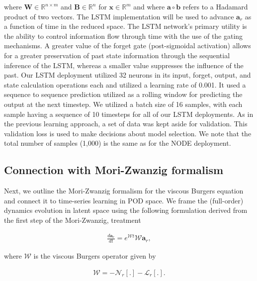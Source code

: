 \documentclass[preprint,12pt]{elsarticle}
\begin{document}
where $\boldsymbol{W} \in \mathbb{R}^{n \times m}$ and $\boldsymbol{B} \in \mathbb{R}^{n}$ for $\mathbf{x} \in \mathbb{R}^m$ and where $\mathbf{a} \circ \mathbf{b}$ refers to a Hadamard product of two vectors. The LSTM implementation will be used to advance $\mathbf{a}_r$ as a function of time in the reduced space. The LSTM network's primary utility is the ability to control information flow through time with the use of the gating mechanisms. A greater value of the forget gate (post-sigmoidal activation) allows for a greater preservation of past state information through the sequential inference of the LSTM, whereas a smaller value suppresses the influence of the past. Our LSTM deployment utilized 32 neurons in its input, forget, output, and state calculation operations each and utilized a learning rate of 0.001. It used a sequence to sequence prediction utilized as a rolling window for predicting the output at the next timestep. We utilized a batch size of 16 samples, with each sample having a sequence of 10 timesteps for all of our LSTM deployments. As in the previous learning approach, a set of data was kept aside for validation. This validation loss is used to make decisions about model selection. We note that the total number of samples (1,000) is the same as for the NODE deployment.

\subsection{Connection with Mori-Zwanzig formalism}

Next, we outline the Mori-Zwanzig formalism \cite{mori1965transport,zwanzig1973nonlinear} for the viscous Burgers equation and connect it to time-series learning in POD space. We frame the (full-order) dynamics evolution in latent space using the following formulation derived from the first step of the Mori-Zwanzig, treatment
\begin{linenomath*}
\begin{align}
\frac{d \textbf{a}_r}{d t} = e^{\mathcal{W} t} \mathcal{W} \mathbf{a}_{r},
\end{align}
\end{linenomath*}
where $\mathcal{W}$ is the viscous Burgers operator given by
\begin{linenomath*}
\begin{align}
\mathcal{W} = -\mathcal{N}_{r}\left[. \right]-\mathcal{L}_{r}\left[ . \right].
\end{align}
\end{linenomath*}
\end{document}
